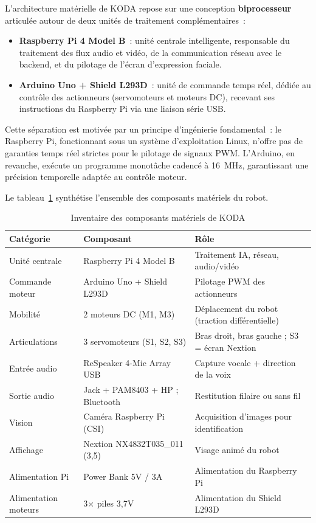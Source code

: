 \documentclass[a4paper,12pt]{report}
\begin{document}
	L'architecture matérielle de KODA repose sur une conception \textbf{biprocesseur}
	articulée autour de deux unités de traitement complémentaires~:
	
	\begin{itemize}
		\item \textbf{Raspberry Pi 4 Model B}~: unité centrale intelligente, responsable
		du traitement des flux audio et vidéo, de la communication réseau avec le
		backend, et du pilotage de l'écran d'expression faciale.
		\item \textbf{Arduino Uno + Shield L293D}~: unité de commande temps réel,
		dédiée au contrôle des actionneurs (servomoteurs et moteurs DC), recevant
		ses instructions du Raspberry Pi via une liaison série USB.
	\end{itemize}
	
	Cette séparation est motivée par un principe d'ingénierie fondamental~: le
	Raspberry Pi, fonctionnant sous un système d'exploitation Linux, n'offre pas
	de garanties temps réel strictes pour le pilotage de signaux PWM. L'Arduino,
	en revanche, exécute un programme monotâche cadencé à 16~MHz, garantissant
	une précision temporelle adaptée au contrôle moteur.
	
	Le tableau~\ref{tab:composants_cycle3} synthétise l'ensemble des composants
	matériels du robot.
	
	\begin{table}[htbp]
		\centering
		\caption{Inventaire des composants matériels de KODA}
		\label{tab:composants_cycle3}
		\renewcommand{\arraystretch}{1.25}
		\begin{tabularx}{\textwidth}{|p{3.5cm}|p{4cm}|X|}
			\hline
			\textbf{Catégorie} & \textbf{Composant} & \textbf{Rôle} \\
			\hline
			Unité centrale & Raspberry Pi 4 Model B & Traitement IA, réseau, audio/vidéo \\
			\hline
			Commande moteur & Arduino Uno + Shield L293D & Pilotage PWM des actionneurs \\
			\hline
			Mobilité & 2 moteurs DC (M1, M3) & Déplacement du robot (traction différentielle) \\
			\hline
			Articulations & 3 servomoteurs (S1, S2, S3) & Bras droit, bras gauche ; S3 = écran Nextion \\
			\hline
			Entrée audio & ReSpeaker 4-Mic Array USB & Capture vocale + direction de la voix \\
			\hline
			Sortie audio & Jack + PAM8403 + HP ; Bluetooth & Restitution filaire ou sans fil \\
			\hline
			Vision & Caméra Raspberry Pi (CSI) & Acquisition d'images pour identification \\
			\hline
			Affichage & Nextion NX4832T035\_011 (3{,}5\textquotedbl) & Visage animé du robot \\
			\hline
			Alimentation Pi & Power Bank 5V / 3A & Alimentation du Raspberry Pi \\
			\hline
			Alimentation moteurs & 3$\times$ piles 3{,}7V & Alimentation du Shield L293D \\
			\hline
		\end{tabularx}
	\end{table}
	
\end{document}
